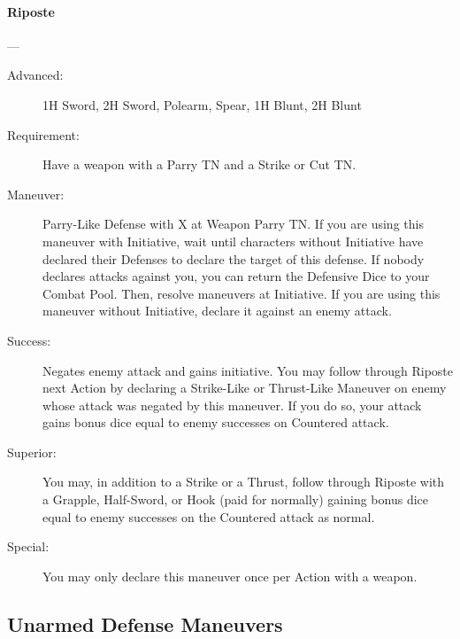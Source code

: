 \documentclass[oneside,11pt,english]{book}
\begin{document}
\paragraph{\large\label{man:Riposte}Riposte}---\quad{\large[2+X]}
\vspace{-10pt}\begin{description}
\item [Advanced:] 1H Sword, 2H Sword, Polearm, Spear, 1H Blunt, 2H Blunt %
\item [Requirement:] Have a weapon with a Parry TN and a Strike or Cut TN. 
\item [Maneuver:] Parry-Like Defense with X at Weapon Parry TN. 
If you are using this maneuver with Initiative, wait until characters without Initiative have declared their 
Defenses to declare the target of this defense. If nobody declares attacks against you, you can return the 
Defensive Dice to your Combat Pool. Then, resolve maneuvers at Initiative. 
If you are using this maneuver without Initiative, declare it against an enemy attack. 
\item [Success:] Negates enemy attack and gains initiative. You may follow through Riposte next Action by 
declaring a Strike-Like or Thrust-Like Maneuver on enemy whose attack was negated by this maneuver. 
If you do so, your attack gains bonus dice equal to enemy successes on Countered attack. 
\item [Superior:] You may, in addition to a Strike or a Thrust, follow through Riposte with a Grapple, 
Half-Sword, or Hook (paid for normally) gaining bonus dice equal to enemy successes on the Countered 
attack as normal. 
\item [Special:] You may only declare this maneuver once per Action with a weapon. 
\end{description}

\subsection{Unarmed Defense Maneuvers}
\end{document}
